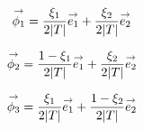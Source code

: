       \begin{minipage}{\textwidth}
        \begin{minipage}{0.329\textwidth}
            \begin{center}
              \begin{tikzpicture}[scale=1]
                
              \end{tikzpicture}
            \end{center}
            \begin{equation*}
              \vect{\phi_1}=\frac{\xi_1}{2|T|}\vect{e_1} + \frac{\xi_2}{{2|T|}}\vect{e_2}
            \end{equation*}
        \end{minipage}
        \begin{minipage}{0.329\textwidth}
            \begin{center}
              \begin{tikzpicture}[scale=1]
                
              \end{tikzpicture}
               \begin{equation*}
                \vect{\phi_2}=\frac{1-\xi_1}{2|T|}\vect{e_1} + \frac{\xi_2}{2|T|}\vect{e_2}
              \end{equation*}
            \end{center}
        \end{minipage}
        \begin{minipage}{0.329\textwidth}
            \begin{center}
              \begin{tikzpicture}[scale=1]
                
              \end{tikzpicture}
              \begin{equation*}
                \vect{\phi_3}=\frac{\xi_1}{2|T|}\vect{e_1} + \frac{1-\xi_2}{2|T|}\vect{e_2}
              \end{equation*}
            \end{center}
        \end{minipage}
        \label{fig:form_int:fon_base:phi}
      \end{minipage}

